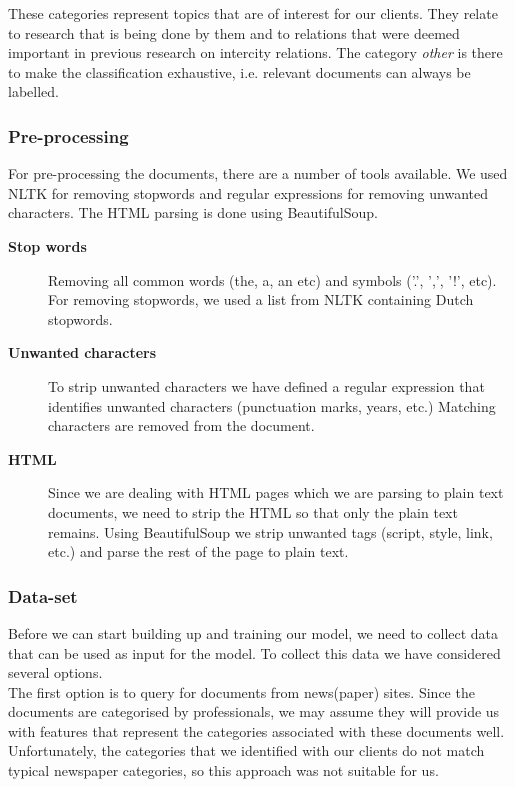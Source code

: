 These categories represent topics that are of interest for our clients. They relate to research that is being done by them and to relations that were deemed important in previous research on intercity relations. The category \textit{other} is there to make the classification exhaustive, i.e. relevant documents can always be labelled.

\subsubsection{Pre-processing}
For pre-processing the documents, there are a number of tools available. We used NLTK \cite{nlkt_stemming} for removing stopwords and regular expressions for removing unwanted characters. The HTML parsing is done using BeautifulSoup\cite{BeautifulSoup}.

\begin{description}
\item[\textbf{Stop words}]
Removing all common words (the, a, an etc) and symbols ('.', ',', '!', etc). For removing stopwords, we used a list from NLTK containing Dutch stopwords.

\item[\textbf{Unwanted characters}]
To strip unwanted characters we have defined a regular expression that identifies unwanted characters (punctuation marks, years, etc.) Matching characters are removed from the document. 

\item[\textbf{HTML}]
Since we are dealing with HTML pages which we are parsing to plain text documents, we need to strip the HTML so that only the plain text remains. Using BeautifulSoup we strip unwanted tags (script, style, link, etc.) and parse the rest of the page to plain text.
\end{description}

\subsubsection{Data-set}
Before we can start building up and training our model, we need to collect data that can be used as input for the model. To collect this data we have considered several options.\\

The first option is to query for documents from news(paper) sites. Since the documents are categorised by professionals, we may assume they will provide us with features that represent the categories associated with these documents well.
Unfortunately, the categories that we identified with our clients do not match typical newspaper categories, so this approach was not suitable for us.\\

